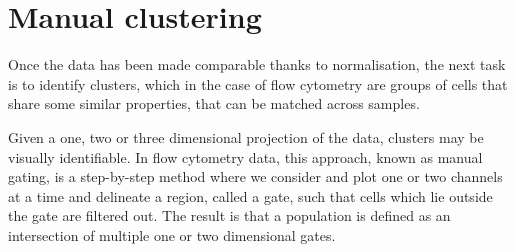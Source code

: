 
%

\section{Manual clustering}

Once the data has been made comparable thanks to normalisation, the next task is to identify clusters, which in the case of flow cytometry are groups of cells that share
some similar properties, that can be matched across samples.  

Given a one, two or three dimensional projection of the data, clusters may be visually identifiable.
In flow cytometry data, this approach, known as manual gating, is a step-by-step method where we consider and plot one or two channels at a time and delineate a region, called a gate, such that cells which lie outside the gate are filtered out.
The result is that a population is defined as an intersection of multiple one or two dimensional gates.

